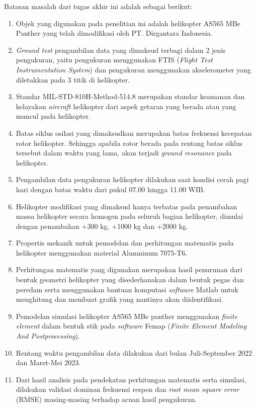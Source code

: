 Batasan masalah dari tugas akhir ini adalah sebagai berikut:

\begin{enumerate}[nolistsep]

  \item Objek yang digunakan pada penelitian ini adalah helikopter AS565 MBe Panther yang telah dimodifikasi oleh PT. Dirgantara Indonesia.
  
  \item \textit{Ground test} pengambilan data yang dimaksud terbagi dalam 2 jenis pengukuran, yaitu pengukuran menggunakan FTIS (\textit{Flight Test Instrumentation System}) dan pengukuran menggunakan akselerometer yang diletakkan pada 3 titik di helikopter.
  
  \item Standar MIL-STD-810H-Method-514.8 merupakan standar keamanan dan kelayakan \textit{aircraft} helikopter dari aspek getaran yang berada atau yang muncul pada helikopter.
  
  \item Batas siklus osilasi yang dimaksudkan merupakan batas frekuensi kecepatan rotor helikopter. Sehingga apabila rotor berada pada rentang batas siklus tersebut dalam waktu yang lama, akan terjadi \textit{ground resonance} pada helikopter.
  
  \item Pengambilan data pengukuran helikopter dilakukan saat kondisi cerah pagi hari dengan batas waktu dari pukul 07.00 hingga 11.00 WIB.
    
  \item Helikopter modifikasi yang dimaksud hanya terbatas pada penambahan massa helikopter secara homogen pada seluruh bagian helikopter, dimulai dengan penambahan +300 kg, +1000 kg dan +2000 kg.
  
  \item Propertis mekanik untuk pemodelan dan perhitungan matematis pada helikopter menggunakan material Alumninum 7075-T6.
 
  \item Perhitungan matematis yang digunakan merupakan hasil penurunan dari bentuk geometri helikopter yang disederhanakan dalam bentuk pegas dan peredam serta menggunakan bantuan komputasi \textit{software} Matlab untuk menghitung dan membuat grafik yang nantinya akan diidentifikasi.

  \item Pemodelan simulasi helikopter AS565 MBe panther menggunakan \textit{finite element} dalam bentuk stik pada \textit{software} Femap (\textit{Finite Element Modeling And Postprocessing}).
  
  \item Rentang waktu pengambilan data dilakukan dari bulan Juli-September 2022 dan Maret-Mei 2023.
  
  \item Dari hasil analisis pada pendekatan perhitungan matematis serta simulasi, dilakukan validasi dominan frekuensi respon dan \textit{root mean square error} (RMSE) masing-masing terhadap acuan hasil pengukuran. 

\end{enumerate}

